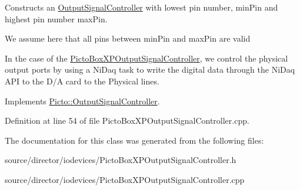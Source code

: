 Constructs an \hyperlink{class_picto_1_1_output_signal_controller}{Output\-Signal\-Controller} with lowest pin number, min\-Pin and highest pin number max\-Pin. 

We assume here that all pins between min\-Pin and max\-Pin are valid

In the case of the \hyperlink{class_picto_1_1_picto_box_x_p_output_signal_controller}{Picto\-Box\-X\-P\-Output\-Signal\-Controller}, we control the physical output ports by using a Ni\-Daq task to write the digital data through the Ni\-Daq A\-P\-I to the D/\-A card to the Physical lines. 

Implements \hyperlink{class_picto_1_1_output_signal_controller_a8b320e17548cc1fa5d5b9c577aac2882}{Picto\-::\-Output\-Signal\-Controller}.



Definition at line 54 of file Picto\-Box\-X\-P\-Output\-Signal\-Controller.\-cpp.



The documentation for this class was generated from the following files\-:\begin{DoxyCompactItemize}
\item 
source/director/iodevices/Picto\-Box\-X\-P\-Output\-Signal\-Controller.\-h\item 
source/director/iodevices/Picto\-Box\-X\-P\-Output\-Signal\-Controller.\-cpp\end{DoxyCompactItemize}
